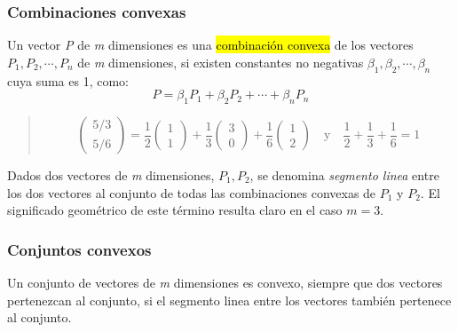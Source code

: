 \subsubsection{Combinaciones convexas}

Un vector \textit{P} de \textit{m} dimensiones es una \hl{combinación convexa} de los vectores \(P_1, P_2, \cdots, P_n\) de \textit{m} dimensiones, si existen constantes no negativas \(\beta_1, \beta_2, \cdots, \beta_n\) cuya suma es 1, como:
\begin{equation}
  P = \beta_1 P_1 + \beta_2 P_2 + \cdots + \beta_n P_n
  \label{eq:def_convexo}
\end{equation}

\begin{quote}
  \[
    \begin{pmatrix}
      5/3 \\ 5/6
    \end{pmatrix} = \frac{1}{2}\begin{pmatrix}
      1 \\ 1
    \end{pmatrix} + \frac{1}{3} \begin{pmatrix}
      3 \\ 0
    \end{pmatrix} + \frac{1}{6}\begin{pmatrix}
      1 \\ 2
    \end{pmatrix} \quad \text{y} \quad \frac{1}{2}+\frac{1}{3}+\frac{1}{6} = 1
  \]
\end{quote}

Dados dos vectores de \textit{m} dimensiones, \(P_1, P_2\), se denomina \textit{segmento linea} entre los dos vectores al conjunto de todas las combinaciones convexas de \(P_1\) y \(P_2\). El significado geométrico de este término resulta claro en el caso \(m=3\).

\subsubsection{Conjuntos convexos}

Un conjunto de vectores de \textit{m} dimensiones es convexo, siempre que dos vectores pertenezcan al conjunto, si el segmento linea entre los vectores también pertenece al conjunto.


